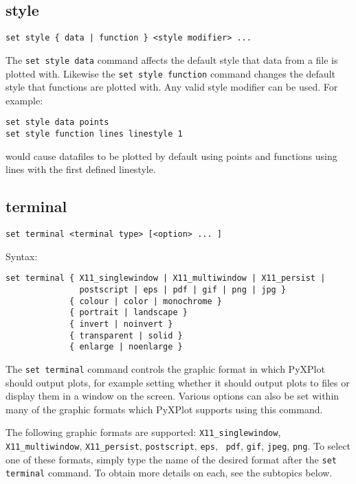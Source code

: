 \documentclass[a4paper,onecolumn,11pt]{book}
\begin{document}
\subsection{style}

\begin{verbatim}
set style { data | function } <style modifier> ...
\end{verbatim}

The {\tt set style data} command affects the default style that data from a file
is plotted with.  Likewise the {\tt set style function} command changes the
default style that functions are plotted with.  Any valid style modifier can be
used.  For example:

\begin{verbatim}
set style data points
set style function lines linestyle 1
\end{verbatim}

\noindent would cause datafiles to be plotted by default using points and
functions using lines with the first defined linestyle.
 
\subsection{terminal}

\begin{verbatim}
set terminal <terminal type> [<option> ... ]
\end{verbatim}

Syntax:

\begin{verbatim}
set terminal { X11_singlewindow | X11_multiwindow | X11_persist | 
               postscript | eps | pdf | gif | png | jpg } 
             { colour | color | monochrome } 
             { portrait | landscape } 
             { invert | noinvert } 
             { transparent | solid }
             { enlarge | noenlarge }
\end{verbatim}

The {\tt set terminal} command controls the graphic format in which PyXPlot
should output plots, for example setting whether it should output plots to files
or display them in a window on the screen. Various options can also be set
within many of the graphic formats which PyXPlot supports using this command.

The following graphic formats are supported:  {\tt X11\_singlewindow},
\newline\noindent %
{\tt X11\_multiwindow}, {\tt X11\_persist}, {\tt postscript}, {\tt eps}, {\tt
pdf}, {\tt gif}, {\tt jpeg}, {\tt png}. To select one of these formats, simply
type the name of the desired format after the {\tt set terminal} command. To
obtain more details on each, see the subtopics below.
\end{document}

